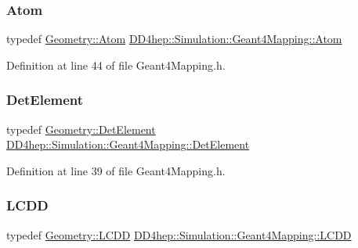 \subsubsection{\texorpdfstring{Atom}{Atom}}
{\footnotesize\ttfamily typedef \hyperlink{class_d_d4hep_1_1_geometry_1_1_atom}{Geometry\+::\+Atom} \hyperlink{class_d_d4hep_1_1_simulation_1_1_geant4_mapping_aa33a3f44904c6184ee883c244baa9554}{D\+D4hep\+::\+Simulation\+::\+Geant4\+Mapping\+::\+Atom}}



Definition at line 44 of file Geant4\+Mapping.\+h.

\hypertarget{class_d_d4hep_1_1_simulation_1_1_geant4_mapping_a58a1cf6fc60a0928c1048fb1d32fcea5}{}\label{class_d_d4hep_1_1_simulation_1_1_geant4_mapping_a58a1cf6fc60a0928c1048fb1d32fcea5} 
\subsubsection{\texorpdfstring{Det\+Element}{DetElement}}
{\footnotesize\ttfamily typedef \hyperlink{class_d_d4hep_1_1_geometry_1_1_det_element}{Geometry\+::\+Det\+Element} \hyperlink{class_d_d4hep_1_1_simulation_1_1_geant4_mapping_a58a1cf6fc60a0928c1048fb1d32fcea5}{D\+D4hep\+::\+Simulation\+::\+Geant4\+Mapping\+::\+Det\+Element}}



Definition at line 39 of file Geant4\+Mapping.\+h.

\hypertarget{class_d_d4hep_1_1_simulation_1_1_geant4_mapping_a7b098323f9ea570a13d220fe3f09da41}{}\label{class_d_d4hep_1_1_simulation_1_1_geant4_mapping_a7b098323f9ea570a13d220fe3f09da41} 
\subsubsection{\texorpdfstring{L\+C\+DD}{LCDD}}
{\footnotesize\ttfamily typedef \hyperlink{class_d_d4hep_1_1_geometry_1_1_l_c_d_d}{Geometry\+::\+L\+C\+DD} \hyperlink{class_d_d4hep_1_1_simulation_1_1_geant4_mapping_a7b098323f9ea570a13d220fe3f09da41}{D\+D4hep\+::\+Simulation\+::\+Geant4\+Mapping\+::\+L\+C\+DD}}



